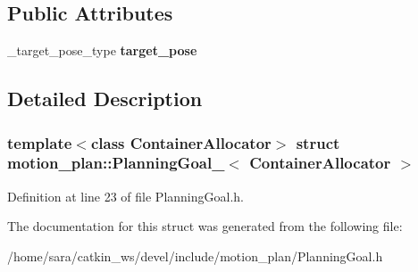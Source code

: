 \subsection*{Public Attributes}
\begin{DoxyCompactItemize}
\item 
\mbox{\label{structmotion__plan_1_1PlanningGoal___ac84e236cc6de90937b22609aa70b370a}} 
\+\_\+target\+\_\+pose\+\_\+type {\bfseries target\+\_\+pose}
\end{DoxyCompactItemize}


\subsection{Detailed Description}
\subsubsection*{template$<$class Container\+Allocator$>$\newline
struct motion\+\_\+plan\+::\+Planning\+Goal\+\_\+$<$ Container\+Allocator $>$}



Definition at line 23 of file Planning\+Goal.\+h.



The documentation for this struct was generated from the following file\+:\begin{DoxyCompactItemize}
\item 
/home/sara/catkin\+\_\+ws/devel/include/motion\+\_\+plan/Planning\+Goal.\+h\end{DoxyCompactItemize}
